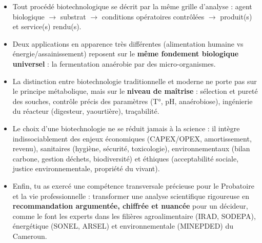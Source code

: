 \documentclass[11pt]{article}
\newcommand{\cle}[1]{{\popxbold\color{popdark}#1}}
\begin{document}
\begin{itemize}
\item Tout procédé biotechnologique se décrit par la même grille d'analyse : \cle{agent biologique} $\rightarrow$ \cle{substrat} $\rightarrow$ \cle{conditions opératoires contrôlées} $\rightarrow$ \cle{produit(s)} et \cle{service(s) rendu(s)}.
\item Deux applications en apparence très différentes (alimentation humaine vs énergie/assainissement) reposent sur le \textbf{même fondement biologique universel} : la fermentation anaérobie par des micro-organismes.
\item La distinction entre biotechnologie \cle{traditionnelle} et \cle{moderne} ne porte pas sur le principe métabolique, mais sur le \textbf{niveau de maîtrise} : sélection et pureté des souches, contrôle précis des paramètres (T°, pH, anaérobiose), ingénierie du réacteur (digesteur, yaourtière), traçabilité.
\item Le choix d'une biotechnologie ne se réduit jamais à la science : il intègre indissociablement des \cle{enjeux économiques} (CAPEX/OPEX, amortissement, revenu), \cle{sanitaires} (hygiène, sécurité, toxicologie), \cle{environnementaux} (bilan carbone, gestion déchets, biodiversité) et \cle{éthiques} (acceptabilité sociale, justice environnementale, propriété du vivant).
\item Enfin, tu as exercé une compétence transversale précieuse pour le Probatoire et la vie professionnelle : transformer une analyse scientifique rigoureuse en \textbf{recommandation argumentée, chiffrée et nuancée} pour un décideur, comme le font les experts dans les filières agroalimentaire (IRAD, SODEPA), énergétique (SONEL, ARSEL) et environnementale (MINEPDED) du Cameroun.
\end{itemize}
\end{document}
